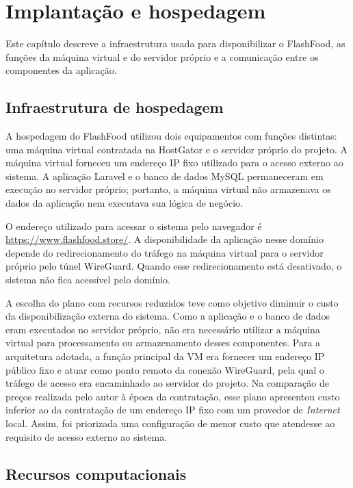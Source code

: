 \chapter{Implantação e hospedagem}
\label{chap:implantacao}

Este capítulo descreve a infraestrutura usada para disponibilizar o FlashFood, as funções da máquina virtual e do servidor próprio e a comunicação entre os componentes da aplicação.

\section{Infraestrutura de hospedagem}

A hospedagem do FlashFood utilizou dois equipamentos com funções distintas: uma máquina virtual contratada na HostGator e o servidor próprio do projeto. A máquina virtual forneceu um endereço IP fixo utilizado para o acesso externo ao sistema. A aplicação Laravel e o banco de dados MySQL permaneceram em execução no servidor próprio; portanto, a máquina virtual não armazenava os dados da aplicação nem executava sua lógica de negócio.

O endereço utilizado para acessar o sistema pelo navegador é \url{https://www.flashfood.store/}. A disponibilidade da aplicação nesse domínio depende do redirecionamento do tráfego na máquina virtual para o servidor próprio pelo túnel WireGuard. Quando esse redirecionamento está desativado, o sistema não fica acessível pelo domínio.

A escolha do plano com recursos reduzidos teve como objetivo diminuir o custo da disponibilização externa do sistema. Como a aplicação e o banco de dados eram executados no servidor próprio, não era necessário utilizar a máquina virtual para processamento ou armazenamento desses componentes. Para a arquitetura adotada, a função principal da VM era fornecer um endereço IP público fixo e atuar como ponto remoto da conexão WireGuard, pela qual o tráfego de acesso era encaminhado ao servidor do projeto. Na comparação de preços realizada pelo autor à época da contratação, esse plano apresentou custo inferior ao da contratação de um endereço IP fixo com um provedor de \textit{Internet} local. Assim, foi priorizada uma configuração de menor custo que atendesse ao requisito de acesso externo ao sistema.

\section{Recursos computacionais}

